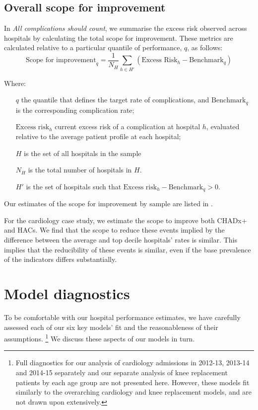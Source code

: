 \documentclass[submission]{grattan}
\newcommand*{\myTitle}{All complications should count}
\begin{document}
\subsection{Overall scope for improvement}\label{subsec:overall-scope-for-improvement}

In \textit{\myTitle}, we summarise the excess risk observed across hospitals by calculating the total scope for improvement.
These metrics are calculated relative to a particular quantile of performance, \(q\), as follows:
\[\text{Scope for improvement}_{q} = \frac{1}{N_H}\sum_{h \in H'} {(\text{Excess Risk}_{h} - \text{Benchmark}_{q})}\]

Where:

\begin{itemize}[leftmargin=3em]
\item[\(q\)] the quantile that defines the target rate of complications, and \(\text{Benchmark}_{q}\) is the corresponding complication rate;
\item[\(\text{Excess risk}_{h}\)] current excess risk of a complication at hospital \(h\), evaluated relative to the average patient profile at each hospital;
\item[\(H\)] is the set of all hospitals in the sample
\item[\(N_H\)] is the total number of hospitals in \(H\).
\item[\(H'\)] is the set of hospitals such that \(\text{Excess risk}_{h} - \text{Benchmark}_{q} > 0\).
\end{itemize}

Our estimates of the scope for improvement by sample are listed in .



For the cardiology case study, we estimate the scope to improve both CHADx+ and HACs.
We find that the scope to reduce these events implied by the difference between the average and top decile hospitals' rates is similar.
This implies that the reducibility of these events is similar, even if the base prevalence of the indicators differs substantially.

\section{Model diagnostics}\label{sec:model-diagnostics}

To be comfortable with our hospital performance estimates, we have carefully assessed each of our six key models' fit and the reasonableness of their assumptions.%
\footnote{Full diagnostics for our analysis of cardiology admissions in 2012-13, 2013-14 and 2014-15 separately and our separate analysis of knee replacement patients by each age group are not presented here.
However, these models fit similarly to the overarching cardiology and knee replacement models, and are not drawn upon extensively.}
We discuss these aspects of our models in turn.
\end{document}
